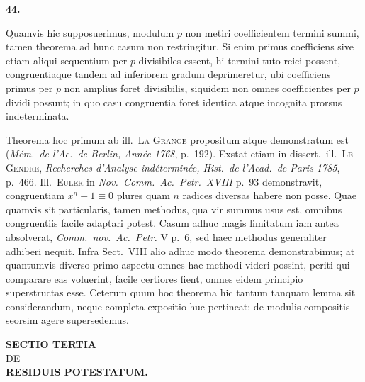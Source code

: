 \documentclass[12pt,a4paper]{article}
\begin{document}
\bigskip

\noindent\textbf{44.}

\medskip

Quamvis hic supposuerimus, modulum $p$ non metiri coefficientem termini summi,
tamen theorema ad hunc casum non restringitur. Si enim primus coefficiens sive etiam
aliqui sequentium per $p$ divisibiles essent, hi termini tuto reici possent,
congruentiaque tandem ad inferiorem gradum deprimeretur, ubi coefficiens primus per
$p$ non amplius foret divisibilis, siquidem non omnes coefficientes per $p$ dividi
possunt; in quo casu congruentia foret identica atque incognita prorsus
indeterminata.

\medskip

Theorema hoc primum ab ill.\ \textsc{La Grange} propositum atque demonstratum est
(\textit{M\'em.\ de l'Ac.\ de Berlin, Ann\'ee 1768}, p.~192). Exstat etiam in dissert.\
ill.\ \textsc{Le Gendre}, \textit{Recherches d'Analyse ind\'etermin\'ee, Hist.\ de
l'Acad.\ de Paris 1785}, p.~466. Ill.\ \textsc{Euler} in \textit{Nov.\ Comm.\ Ac.\
Petr.\ XVIII} p.~93 demonstravit, congruentiam $x^{n} - 1 \equiv 0$ plures quam $n$
radices diversas habere non posse. Quae quamvis sit particularis, tamen methodus,
qua vir summus usus est, omnibus congruentiis facile adaptari potest. Casum adhuc
magis limitatum iam antea absolverat, \textit{Comm.\ nov.\ Ac.\ Petr.} V p.~6, sed
haec methodus generaliter adhiberi nequit. Infra Sect.\ VIII alio adhuc modo
theorema demonstrabimus; at quantumvis diverso primo aspectu omnes hae methodi videri
possint, periti qui comparare eas voluerint, facile certiores fient, omnes eidem
principio superstructas esse. Ceterum quum hoc theorema hic tantum tanquam lemma sit
considerandum, neque completa expositio huc pertineat: de modulis compositis seorsim
agere supersedemus.

\clearpage


\begin{center}
\Large\textbf{SECTIO TERTIA}\\[0.5em]
\normalsize\textsc{DE}\\[0.3em]
\Large\textbf{RESIDUIS POTESTATUM.}
\end{center}
\end{document}
